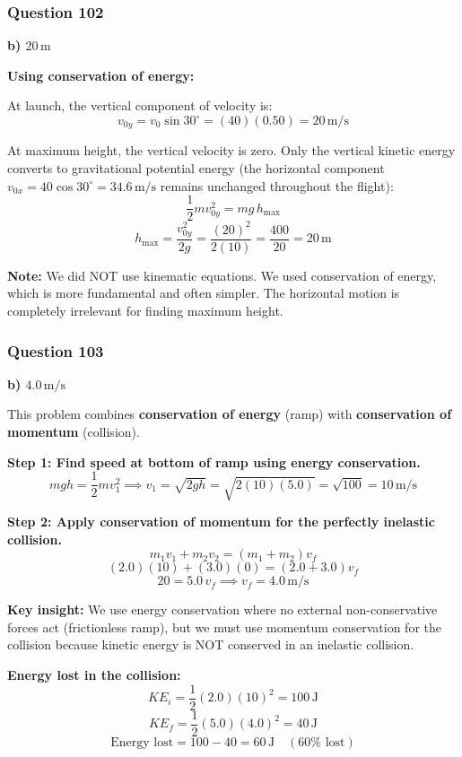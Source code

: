 \documentclass[12pt,letterpaper]{article}
\begin{document}
\subsubsection*{Question 102}

\begin{answerbox}
\textbf{b) $20\,\text{m}$}
\end{answerbox}

\begin{explanationbox}
\textbf{Using conservation of energy:}

At launch, the vertical component of velocity is:
\[
v_{0y} = v_0 \sin 30^\circ = (40)(0.50) = 20\,\text{m/s}
\]

At maximum height, the vertical velocity is zero. Only the vertical kinetic energy converts to gravitational potential energy (the horizontal component $v_{0x} = 40\cos 30^\circ = 34.6\,\text{m/s}$ remains unchanged throughout the flight):
\[
\frac{1}{2}mv_{0y}^2 = mg\,h_{\max}
\]
\[
h_{\max} = \frac{v_{0y}^2}{2g} = \frac{(20)^2}{2(10)} = \frac{400}{20} = 20\,\text{m}
\]

\textbf{Note:} We did NOT use kinematic equations. We used conservation of energy, which is more fundamental and often simpler. The horizontal motion is completely irrelevant for finding maximum height.
\end{explanationbox}

\subsubsection*{Question 103}

\begin{answerbox}
\textbf{b) $4.0\,\text{m/s}$}
\end{answerbox}

\begin{explanationbox}
This problem combines \textbf{conservation of energy} (ramp) with \textbf{conservation of momentum} (collision).

\textbf{Step 1: Find speed at bottom of ramp using energy conservation.}
\[
mgh = \frac{1}{2}mv_1^2 \implies v_1 = \sqrt{2gh} = \sqrt{2(10)(5.0)} = \sqrt{100} = 10\,\text{m/s}
\]

\textbf{Step 2: Apply conservation of momentum for the perfectly inelastic collision.}
\[
m_1 v_1 + m_2 v_2 = (m_1 + m_2)v_f
\]
\[
(2.0)(10) + (3.0)(0) = (2.0 + 3.0)v_f
\]
\[
20 = 5.0\,v_f \implies v_f = 4.0\,\text{m/s}
\]

\textbf{Key insight:} We use energy conservation where no external non-conservative forces act (frictionless ramp), but we must use momentum conservation for the collision because kinetic energy is NOT conserved in an inelastic collision.

\textbf{Energy lost in the collision:}
\[
KE_i = \frac{1}{2}(2.0)(10)^2 = 100\,\text{J}
\]
\[
KE_f = \frac{1}{2}(5.0)(4.0)^2 = 40\,\text{J}
\]
\[
\text{Energy lost} = 100 - 40 = 60\,\text{J} \quad (60\%\text{ lost})
\]
\end{explanationbox}
\end{document}
